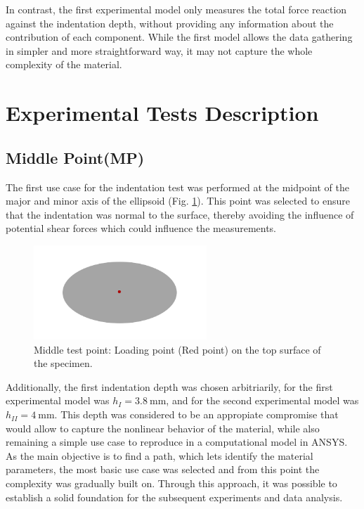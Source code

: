 In contrast, the first experimental model only measures the total force reaction 
against the indentation depth, without providing any information about the contribution 
of each component. While the first model allows the data 
gathering in simpler and more straightforward way, it may not capture 
the whole complexity of the material.

\section{Experimental Tests Description}

\subsection*{Middle Point(MP)}
\label{subsection:midpoint}
The first use case for the indentation test was performed at the midpoint 
of the major and minor axis of the ellipsoid (Fig. \ref{fig:midpoint}). This point was selected 
to ensure that the indentation was normal to the surface, thereby avoiding 
the influence of potential shear forces which could influence the 
measurements.

\begin{figure}%
    \centering
   \quad
   \includegraphics[width=6.5cm]{Images/Experiment/specimenmidp.png}%
   \caption{Middle test point: Loading point (Red point) on the top surface of the specimen.}%
   \label{fig:midpoint}%
\end{figure}

Additionally, the first indentation depth was chosen arbitriarily, for the first 
experimental model was $h_{I} = \SI{3.8}{\milli \m}$, and for the second 
experimental model was $h_{II} = \SI{4}{\milli \m}$. This depth was considered 
to be an appropiate compromise that would allow to capture the nonlinear 
behavior of the material, while also remaining a simple use case to 
reproduce in a computational model in ANSYS.\\

As the main objective is to find a path, which lets identify the material 
 parameters, the most basic use case was selected and from this point 
the complexity was gradually built on. Through this approach, it was possible 
to establish a solid foundation for the subsequent experiments and data analysis.



